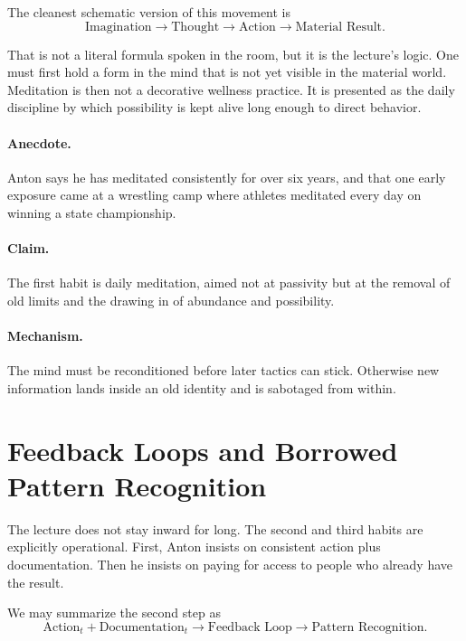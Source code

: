 The cleanest schematic version of this movement is
\begin{equation}
\text{Imagination} \to \text{Thought} \to \text{Action} \to \text{Material Result}.
\end{equation}

That is not a literal formula spoken in the room, but it is the lecture's logic. One must first hold a form in the mind that is not yet visible in the material world. Meditation is then not a decorative wellness practice. It is presented as the daily discipline by which possibility is kept alive long enough to direct behavior.

\paragraph{Anecdote.}
Anton says he has meditated consistently for over six years, and that one early exposure came at a wrestling camp where athletes meditated every day on winning a state championship.

\paragraph{Claim.}
The first habit is daily meditation, aimed not at passivity but at the removal of old limits and the drawing in of abundance and possibility.

\paragraph{Mechanism.}
The mind must be reconditioned before later tactics can stick. Otherwise new information lands inside an old identity and is sabotaged from within.

\section{Feedback Loops and Borrowed Pattern Recognition}

The lecture does not stay inward for long. The second and third habits are explicitly operational. First, Anton insists on consistent action plus documentation. Then he insists on paying for access to people who already have the result.

We may summarize the second step as
\begin{equation}
\text{Action}_t + \text{Documentation}_t \to \text{Feedback Loop} \to \text{Pattern Recognition}.
\end{equation}

